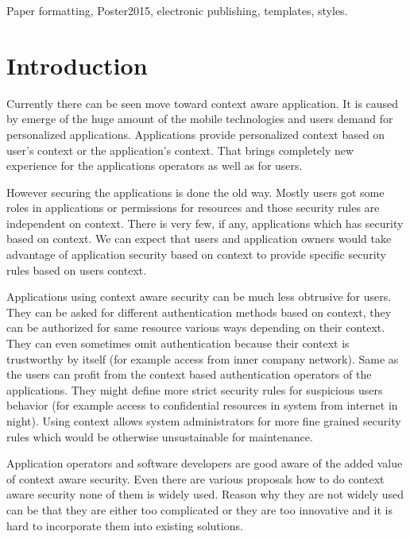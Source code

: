 \documentclass{poster15}
\begin{document}
\begin{keywords}
Paper formatting, Poster2015, electronic publishing, templates, styles.
\end{keywords}


\section{Introduction}

Currently there can be seen move toward context aware application. It is caused by emerge of the huge amount of the mobile technologies and users demand for personalized applications. Applications provide personalized context based on user's context or the application's context. That brings completely new experience for the applications operators as well as for users.

However securing the applications is done the old way. Mostly users got some roles in applications or permissions for resources and those security rules are independent on context. There is very few, if any, applications which has security based on context. We can expect that users and application owners would take advantage of application security based on context to provide specific security rules based on users context.

Applications using context aware security can be much less obtrusive for users. They can be asked for different authentication methods based on context, they can be authorized for same resource various ways depending on their context. They can even sometimes omit authentication because their context is trustworthy by itself (for example access from inner company network). Same as the users can profit from the context based authentication operators of the applications. They might define more strict security rules for suspicious users behavior (for example access to confidential resources in system from internet in night). Using context allows system administrators for more fine grained security rules which would be otherwise unsustainable for maintenance. 

Application operators and software developers are good aware of the added value of context aware security. Even there are various proposals how to do context aware security none of them is widely used. Reason why they are not widely used can be that they are either too complicated or they are too innovative and it is hard to incorporate them into existing solutions.
\end{document}
